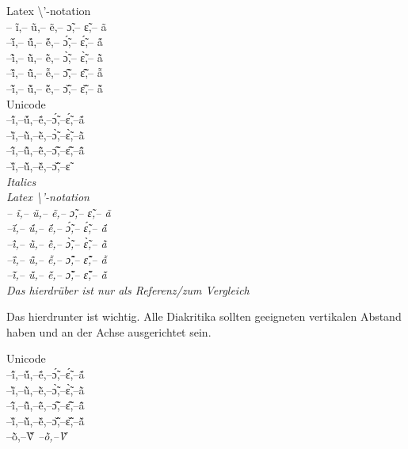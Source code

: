 Latex \textbackslash{}'-notation\\
\noindent
-- ĩ,-- ũ,-- ẽ,-- ɔ̃,-- ɛ̃,-- ã\\
--\'{ĩ},-- \'{ũ},-- \'{ẽ},-- \'{ɔ̃},-- \'{ɛ̃},-- \'{ã}\\
--\`{ĩ},-- \`{ũ},-- \`{ẽ},-- \`{ɔ̃},-- \`{ɛ̃},-- \`{ã}\\
--\^{ĩ},-- \^{ũ},-- \^{ẽ},-- \^{ɔ̃},-- \^{ɛ̃},-- \^{ã}\\
--\v{ĩ},-- \v{ũ},-- \v{ẽ},-- \v{ɔ̃},-- \v{ɛ̃},-- \v{ã}\\
%
Unicode\\
--ĩ́,--ṹ,--ẽ́,--ɔ̃́,--ɛ̃́,--ã́\\
--ĩ̀,--ũ̀,--ẽ̀,--ɔ̃̀,--ɛ̃̀,--ã̀\\
--ĩ̂,--ũ̂,--ẽ̂,--ɔ̃̂,--ɛ̃̂,--ã̂\\
--ĩ̌,--ũ̌,--ẽ̌,--ɔ̃̌,--ɛ̃\\
%
\itshape
Italics\\
Latex \textbackslash{}'-notation\\
-- ĩ,-- ũ,-- ẽ,-- ɔ̃,-- ɛ̃,-- ã\\
--\'{ĩ},-- \'{ũ},-- \'{ẽ},-- \'{ɔ̃},-- \'{ɛ̃},-- \'{ã}\\
--\`{ĩ},-- \`{ũ},-- \`{ẽ},-- \`{ɔ̃},-- \`{ɛ̃},-- \`{ã}\\
--\^{ĩ},-- \^{ũ},-- \^{ẽ},-- \^{ɔ̃},-- \^{ɛ̃},-- \^{ã}\\
--\v{ĩ},-- \v{ũ},-- \v{ẽ},-- \v{ɔ̃},-- \v{ɛ̃},-- \v{ã}\\
%

Das hierdrüber ist nur als Referenz/zum Vergleich

Das hierdrunter ist wichtig. Alle Diakritika sollten geeigneten vertikalen Abstand haben und an der Achse ausgerichtet sein. 

Unicode\\
\noindent
--ĩ́,--ṹ,--ẽ́,--ɔ̃́,--ɛ̃́,--ã́\\
--ĩ̀,--ũ̀,--ẽ̀,--ɔ̃̀,--ɛ̃̀,--ã̀\\
--ĩ̂,--ũ̂,--ẽ̂,--ɔ̃̂,--ɛ̃̂,--ã̂\\
--ĩ̌,--ũ̌,--ẽ̌,--ɔ̃̌,--ɛ̃̌,--ã̌\\

\normalfont
--õ̀,--Ṽ̀
\itshape 
--õ̀,--Ṽ̀



